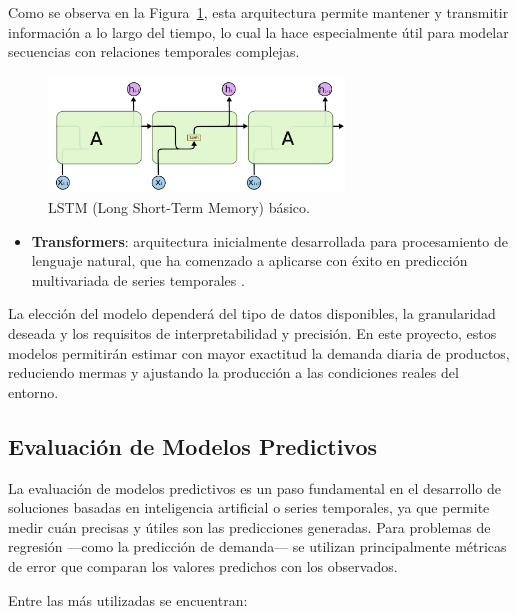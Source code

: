 Como se observa en la Figura~\ref{fig:lstm}, esta arquitectura permite mantener y transmitir información a lo largo del tiempo, lo cual la hace especialmente útil para modelar secuencias con relaciones temporales complejas.

\begin{figure}[t]
    \centering
    \includegraphics[width=0.7\textwidth]{images/lstm.png}
    \caption{LSTM (Long Short-Term Memory) básico.}
    \label{fig:lstm}
\end{figure}

\begin{itemize}
    \item \textbf{Transformers}: arquitectura inicialmente desarrollada para procesamiento de lenguaje natural, que ha comenzado a aplicarse con éxito en predicción multivariada de series temporales \parencite{li2019}.
\end{itemize}

La elección del modelo dependerá del tipo de datos disponibles, la granularidad deseada y los requisitos de interpretabilidad y precisión. En este proyecto, estos modelos permitirán estimar con mayor exactitud la demanda diaria de productos, reduciendo mermas y ajustando la producción a las condiciones reales del entorno.

\subsection{Evaluación de Modelos Predictivos}

La evaluación de modelos predictivos es un paso fundamental en el desarrollo de soluciones basadas en inteligencia artificial o series temporales, ya que permite medir cuán precisas y útiles son las predicciones generadas. Para problemas de regresión —como la predicción de demanda— se utilizan principalmente métricas de error que comparan los valores predichos con los observados.

Entre las más utilizadas se encuentran:

